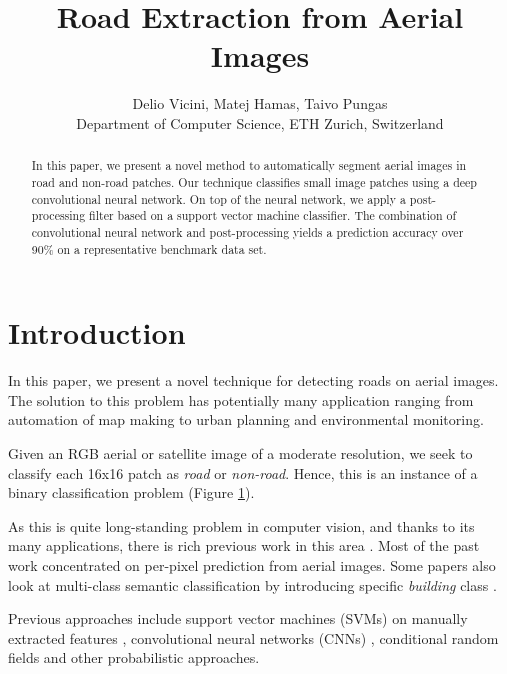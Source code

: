 \documentclass[10pt,conference,compsocconf]{IEEEtran}
\begin{document}
\title{Road Extraction from Aerial Images}
\author{
  Delio Vicini, Matej Hamas, Taivo Pungas\\
  Department of Computer Science, ETH Zurich, Switzerland
}

\maketitle

\begin{abstract}
In this paper, we present a novel method to automatically segment aerial images in road and non-road patches. Our technique classifies small image patches using a deep convolutional neural network. On top of the neural network, we apply a post-processing filter based on a support vector machine classifier. The combination of convolutional neural network and post-processing yields a prediction accuracy over 90\% on a representative benchmark data set.
\end{abstract}

\section{Introduction}
\label{sec:intro}

In this paper, we present a novel technique for detecting roads on aerial images. The solution to this problem has potentially many application ranging from automation of map making to urban planning and environmental monitoring.

Given an RGB aerial or satellite image of a moderate resolution, we seek to classify each 16x16 patch as \textit{road} or \textit{non-road}. Hence, this is an instance of a binary classification problem (Figure \ref{sec:intro}).

As this is quite long-standing problem in computer vision, and thanks to its many applications, there is rich previous work in this area \cite{Huang.2002} \cite{MnihThesis.2013} \cite{Long.2014} \cite{Montoya.2015} \cite{Saito.2015}. Most of the past work concentrated on per-pixel prediction from aerial images. Some papers also look at multi-class semantic classification by introducing specific \textit{building} class \cite{Saito.2015}. 

Previous approaches include support vector machines (SVMs) on manually extracted features \cite{Huang.2002}, convolutional neural networks (CNNs) \cite{Long.2014} \cite{Saito.2015}, conditional random fields \cite{Montoya.2015} and other probabilistic approaches.
\end{document}
